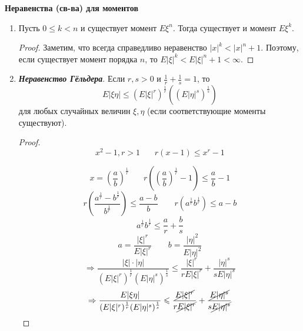 \begin{center}
	\textbf{Неравенства (св-ва) для моментов}
\end{center}
\begin{enumerate}
	\item Пусть $0 \le k < n$ и существует момент $E\xi^n$. Тогда существует и момент $E\xi^k$.
	\begin{proof}
		Заметим, что всегда справедливо неравенство $|x|^k < |x|^n + 1$. Поэтому, если существует момент порядка $n$, то $E |\xi|^k < E |\xi|^n + 1 < \infty$.
	\end{proof}
	\item \textit{\textbf{Неравенство Гёльдера}}. Если $r, s > 0$ и $\frac{1}{r} + \frac{1}{s} = 1$, то
	\[ E |\xi \eta| \le (E|\xi|^r)^{\frac{1}{r}} ( ( E |\eta|^s )^{\frac{1}{s}} ) \]
	для любых случайных величин $\xi, \eta$ (если соответствующие моменты существуют).
	\begin{proof}
		\[ x^2 - 1, r > 1 ~~~~~~~~ r(x - 1) \le x^r - 1 \] 
		\begin{figure}[H]
		\end{figure}
		\[ x = \left( \frac{a}{b} \right)^{\frac{1}{r}} ~~~~~~~~ r \left( \left( \frac{a}{b} \right)^{\frac{1}{r}} - 1 \right) \le \frac{a}{b} - 1 \]
		\[ r \left( \frac{a^{\frac{1}{r}} - b^{\frac{1}{r}}}{b^{\frac{1}{r}}} \right) \le \frac{a - b}{b} ~~~~~~~~~ r (a^{\frac{1}{r}} b^{\frac{1}{r}} ) \le a - b \]
		\[ a^{\frac{1}{r}} b^{\frac{1}{r}} \le \frac{a}{r} + \frac{b}{s} \]
		\[ a = \frac{|\xi|^r}{E |\xi|^r} ~~~~~~~~~ b = \frac{|\eta|^2}{E|\eta|^2} \]
		\[ \Rightarrow \frac{|\xi| \cdot |\eta|}{(E |\xi|^r)^{\frac{1}{r}} (E |\eta|^s)^{\frac{1}{s}}} \le \frac{|\xi|^r}{r E |\xi|^r} + \frac{|\eta|^s}{s E |\eta|^s} \]
		\[ \Rightarrow \frac{E |\xi \eta|}{(E |\xi|^r)^{\frac{1}{r}} (E |\eta|^s)^{\frac{1}{s}}} \le \frac{\cancel{E |\xi|^r}}{r \cancel{E |\xi|^r}} + \frac{\cancel{E |\eta|^s}}{s \cancel{E |\eta|^s}} \]

\end{proof}
\end{enumerate}
